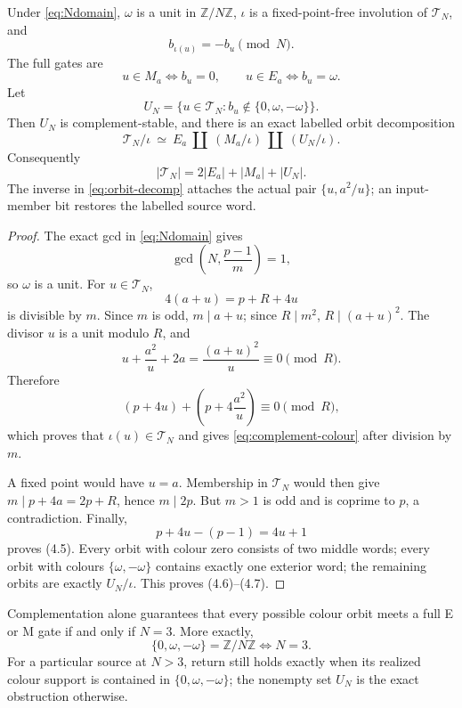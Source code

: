 \begin{theorem}
\label{thm:N-colour}
Under \eqref{eq:Ndomain}, $\omega$ is a unit in $\mathbb Z/N\mathbb Z$,
$\iota$ is a fixed-point-free involution of $\mathcal T_N$, and
\[
 \boxed{b_{\iota(u)}=-b_u\pmod N.}                              \tag{4.4}\label{eq:complement-colour}
\]
The full gates are
\[
 u\in M_a\Longleftrightarrow b_u=0,\qquad
 u\in E_a\Longleftrightarrow b_u=\omega.                        \tag{4.5}
\]
Let
\[
 U_N=\{u\in\mathcal T_N:b_u\notin\{0,\omega,-\omega\}\}.
\]
Then $U_N$ is complement-stable, and there is an exact labelled orbit
decomposition
\[
 \boxed{
 \mathcal T_N/\iota\ \simeq\
 E_a\ \amalg\ (M_a/\iota)\ \amalg\ (U_N/\iota).}              \tag{4.6}\label{eq:orbit-decomp}
\]
Consequently
\[
 \boxed{|\mathcal T_N|=2|E_a|+|M_a|+|U_N|.}                     \tag{4.7}\label{eq:defect-count}
\]
The inverse in \eqref{eq:orbit-decomp} attaches the actual pair
$\{u,a^2/u\}$; an input-member bit restores the labelled source word.
\end{theorem}

\begin{proof}
The exact gcd in \eqref{eq:Ndomain} gives
\[
 \gcd\left(N,\frac{p-1}{m}\right)=1,
\]
so $\omega$ is a unit.  For $u\in\mathcal T_N$,
\[
 4(a+u)=p+R+4u
\]
is divisible by $m$.  Since $m$ is odd, $m\mid a+u$; since $R\mid m^2$,
$R\mid(a+u)^2$.  The divisor $u$ is a unit modulo $R$, and
\[
 u+\frac{a^2}{u}+2a=\frac{(a+u)^2}{u}\equiv0\pmod R.           \tag{4.8}
\]
Therefore
\[
 (p+4u)+\left(p+4\frac{a^2}{u}\right)\equiv0\pmod R,
\]
which proves that $\iota(u)\in\mathcal T_N$ and gives
\eqref{eq:complement-colour} after division by $m$.

A fixed point would have $u=a$.  Membership in $\mathcal T_N$ would then give
$m\mid p+4a=2p+R$, hence $m\mid2p$.  But $m>1$ is odd and is coprime to $p$,
a contradiction.  Finally,
\[
 p+4u-(p-1)=4u+1
\]
proves (4.5).  Every orbit with colour zero consists of two middle words; every
orbit with colours $\{\omega,-\omega\}$ contains exactly one exterior word;
the remaining orbits are exactly $U_N/\iota$.  This proves (4.6)--(4.7).
\end{proof}

\begin{corollary}\label{cor:unique-three}
Complementation alone guarantees that every possible colour orbit meets a full
E or M gate if and only if $N=3$.  More exactly,
\[
 \{0,\omega,-\omega\}=\mathbb Z/N\mathbb Z
 \Longleftrightarrow N=3.                                      \tag{4.9}
\]
For a particular source at $N>3$, return still holds exactly when its realized
colour support is contained in $\{0,\omega,-\omega\}$; the nonempty set $U_N$
is the exact obstruction otherwise.
\end{corollary}

